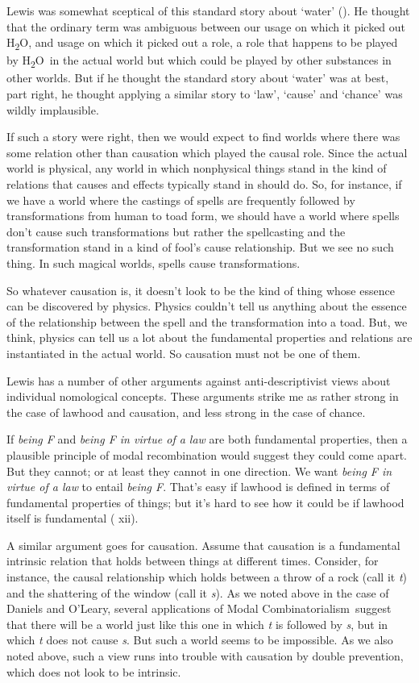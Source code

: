 \documentclass[
  11pt,
  letterpaper,
  DIV=11,
  numbers=noendperiod,
  twoside]{scrartcl}
\begin{document}
Lewis was somewhat sceptical of this standard story about `water'
(). He thought that the ordinary
term was ambiguous between our usage on which it picked out
H\textsubscript{2}O, and usage on which it picked out a role, a role
that happens to be played by H\textsubscript{2}O~in the actual world but
which could be played by other substances in other worlds. But if he
thought the standard story about `water' was at best, part right, he
thought applying a similar story to `law', `cause' and `chance' was
wildly implausible.

If such a story were right, then we would expect to find worlds where
there was some relation other than causation which played the causal
role. Since the actual world is physical, any world in which nonphysical
things stand in the kind of relations that causes and effects typically
stand in should do. So, for instance, if we have a world where the
castings of spells are frequently followed by transformations from human
to toad form, we should have a world where spells don't cause such
transformations but rather the spellcasting and the transformation stand
in a kind of fool's cause relationship. But we see no such thing. In
such magical worlds, spells cause transformations.

So whatever causation is, it doesn't look to be the kind of thing whose
essence can be discovered by physics. Physics couldn't tell us anything
about the essence of the relationship between the spell and the
transformation into a toad. But, we think, physics can tell us a lot
about the fundamental properties and relations are instantiated in the
actual world. So causation must not be one of them.

Lewis has a number of other arguments against anti-descriptivist views
about individual nomological concepts. These arguments strike me as
rather strong in the case of lawhood and causation, and less strong in
the case of chance.

If \emph{being F} and \emph{being F in virtue of a law} are both
fundamental properties, then a plausible principle of modal
recombination would suggest they could come apart. But they cannot; or
at least they cannot in one direction. We want \emph{being F in virtue
of a law} to entail \emph{being F}. That's easy if lawhood is defined in
terms of fundamental properties of things; but it's hard to see how it
could be if lawhood itself is fundamental
( xii).

A similar argument goes for causation. Assume that causation is a
fundamental intrinsic relation that holds between things at different
times. Consider, for instance, the causal relationship which holds
between a throw of a rock (call it \emph{t}) and the shattering of the
window (call it \emph{s}). As we noted above in the case of Daniels and
O'Leary, several applications of Modal Combinatorialism~suggest that
there will be a world just like this one in which \emph{t} is followed
by \emph{s}, but in which \emph{t} does not cause \emph{s}. But such a
world seems to be impossible. As we also noted above, such a view runs
into trouble with causation by double prevention, which does not look to
be intrinsic.
\end{document}
